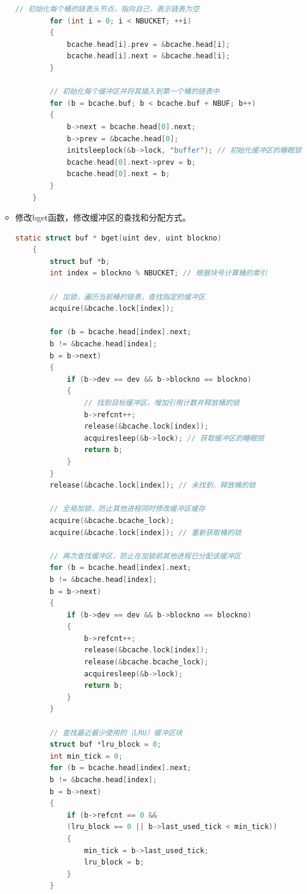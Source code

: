 \begin{enumerate}
\begin{itemize}
\begin{lstlisting}[language=c,title=对binit函数的修改]
        // 初始化每个桶的链表头节点，指向自己，表示链表为空
        for (int i = 0; i < NBUCKET; ++i)
        {
            bcache.head[i].prev = &bcache.head[i];
            bcache.head[i].next = &bcache.head[i];
        }

        // 初始化每个缓冲区并将其插入到第一个桶的链表中
        for (b = bcache.buf; b < bcache.buf + NBUF; b++)
        {
            b->next = bcache.head[0].next;
            b->prev = &bcache.head[0];
            initsleeplock(&b->lock, "buffer"); // 初始化缓冲区的睡眠锁
            bcache.head[0].next->prev = b;
            bcache.head[0].next = b;
        }
    }
              \end{lstlisting}
              \item 修改bget函数，修改缓冲区的查找和分配方式。
                    \begin{lstlisting}[language=c,title=对bget函数的修改]
    static struct buf * bget(uint dev, uint blockno)
    {
        struct buf *b;
        int index = blockno % NBUCKET; // 根据块号计算桶的索引

        // 加锁，遍历当前桶的链表，查找指定的缓冲区
        acquire(&bcache.lock[index]);

        for (b = bcache.head[index].next; 
        b != &bcache.head[index]; 
        b = b->next)
        {
            if (b->dev == dev && b->blockno == blockno)
            {
                // 找到目标缓冲区，增加引用计数并释放桶的锁
                b->refcnt++;
                release(&bcache.lock[index]);
                acquiresleep(&b->lock); // 获取缓冲区的睡眠锁
                return b;
            }
        }
        release(&bcache.lock[index]); // 未找到，释放桶的锁

        // 全局加锁，防止其他进程同时修改缓冲区缓存
        acquire(&bcache.bcache_lock);
        acquire(&bcache.lock[index]); // 重新获取桶的锁

        // 再次查找缓冲区，防止在加锁前其他进程已分配该缓冲区
        for (b = bcache.head[index].next; 
        b != &bcache.head[index]; 
        b = b->next)
        {
            if (b->dev == dev && b->blockno == blockno)
            {
                b->refcnt++;
                release(&bcache.lock[index]);
                release(&bcache.bcache_lock);
                acquiresleep(&b->lock);
                return b;
            }
        }

        // 查找最近最少使用的（LRU）缓冲区块
        struct buf *lru_block = 0;
        int min_tick = 0;
        for (b = bcache.head[index].next; 
        b != &bcache.head[index]; 
        b = b->next)
        {
            if (b->refcnt == 0 && 
            (lru_block == 0 || b->last_used_tick < min_tick))
            {
                min_tick = b->last_used_tick;
                lru_block = b;
            }
        }


\end{lstlisting}
\end{itemize}
\end{enumerate}
